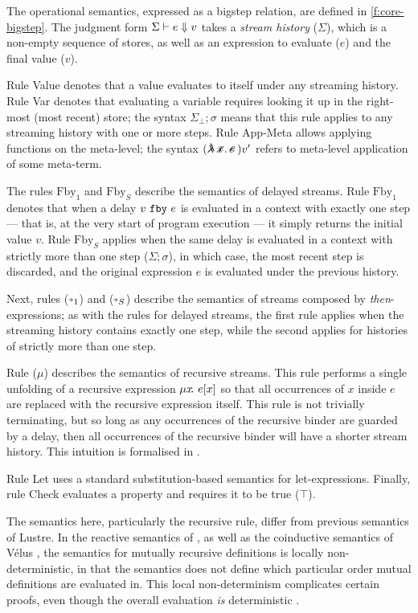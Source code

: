 \documentclass[sigplan,screen]{acmart}
\begin{document}
The operational semantics, expressed as a bigstep relation, are defined in \autoref{f:core-bigstep}.
The judgment form $\Sigma \vdash e \Downarrow v$ takes a \emph{stream history} ($\Sigma$), which is a non-empty sequence of stores, as well as an expression to evaluate ($e$) and the final value ($v$).

Rule Value denotes that a value evaluates to itself under any streaming history.
Rule Var denotes that evaluating a variable requires looking it up in the right-most (most recent) store; the syntax $\Sigma_\bot; \sigma$ means that this rule applies to any streaming history with one or more steps.
Rule App-Meta allows applying functions on the meta-level; the syntax $(\mlamX{}) v'$ refers to meta-level application of some meta-term.

The rules $\mbox{Fby}_1$ and $\mbox{Fby}_S$ describe the semantics of delayed streams.
Rule $\mbox{Fby}_1$ denotes that when a delay $v~\texttt{fby}~e$ is evaluated in a context with exactly one step --- that is, at the very start of program execution --- it simply returns the initial value $v$.
Rule $\mbox{Fby}_S$ applies when the same delay is evaluated in a context with strictly more than one step ($\Sigma; \sigma$), in which case, the most recent step is discarded, and the original expression $e$ is evaluated under the previous history.

Next, rules ($\xthenarrow_1$) and ($\xthenarrow_S$) describe the semantics of streams composed by \emph{then}-expressions; as with the rules for delayed streams, the first rule applies when the streaming history contains exactly one step, while the second applies for histories of strictly more than one step.

Rule ($\mu{}$) describes the semantics of recursive streams.
This rule performs a single unfolding of a recursive expression $\mu{} x \!.~e[x]$ so that all occurrences of $x$ inside $e$ are replaced with the recursive expression itself.
This rule is not trivially terminating, but so long as any occurrences of the recursive binder are guarded by a delay, then all occurrences of the recursive binder will have a shorter stream history.
This intuition is formalised in \REF{}.

Rule Let uses a standard substitution-based semantics for let-expressions.
Finally, rule Check evaluates a property and requires it to be true ($\top$).

The semantics here, particularly the recursive rule, differ from previous semantics of Lustre.
In the reactive semantics of \cite{caspi1995functional}, as well as the coinductive semantics of Vélus , the semantics for mutually recursive definitions is locally non-deterministic, in that the semantics does not define which particular order mutual definitions are evaluated in.
This local non-determinism complicates certain proofs, even though the overall evaluation \emph{is} deterministic .
\end{document}
